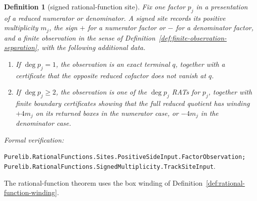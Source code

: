 \documentclass[11pt]{article}
\newtheorem{definition}[theorem]{Definition}
\newcommand{\Defref}[1]{Definition~\ref{#1}}
\newcommand{\leanref}[1]{\par\smallskip\noindent
  \emph{Formal verification:}\par\nobreak
  {\raggedright\nolinkurl{#1}.\par}}
\begin{document}
\begin{definition}[signed rational-function site]
\label{def:signed-site}
Fix one factor $p_j$ in a presentation of a reduced numerator or
denominator.  A \emph{signed site} records its positive multiplicity $m_j$,
the sign $+$ for a numerator factor or $-$ for a denominator factor, and a
finite observation in the sense of
\Defref{def:finite-observation-separation}, with the following additional
data.
\begin{enumerate}[label=(\roman*)]
\item If $\deg p_j=1$, the observation is an exact terminal $q$, together
with a certificate that the opposite reduced cofactor does not vanish at
$q$.
\item If $\deg p_j\ge2$, the observation is one of the $\deg p_j$ RATs for
$p_j$, together with
finite boundary certificates showing that the full reduced quotient has
winding $+4m_j$ on its returned boxes in the numerator case, or $-4m_j$ in
the denominator case.
\end{enumerate}
\end{definition}

\leanref{Purelib.RationalFunctions.Sites.PositiveSideInput.FactorObservation;
Purelib.RationalFunctions.SignedMultiplicity.TrackSiteInput}

The rational-function theorem uses the box winding of
\Defref{def:rational-function-winding}.
\end{document}
